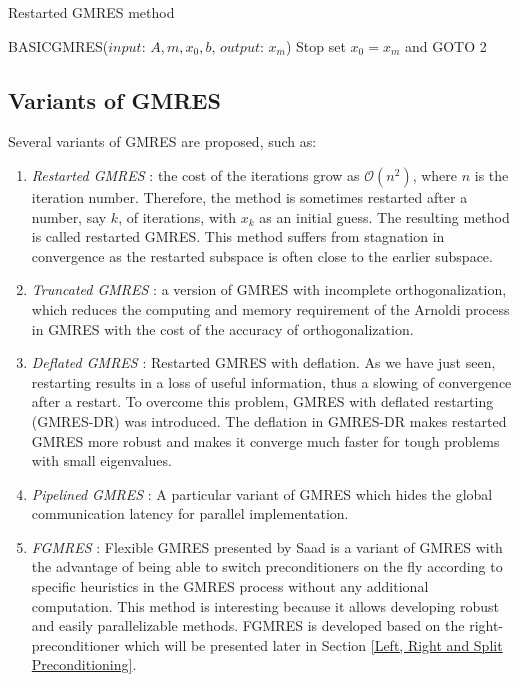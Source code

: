 \begin{algorithm}[htbp]
	\caption{Restarted GMRES method}
	\label{alg:rgmres}
	\begin{algorithmic}[1]
		\State BASICGMRES($input$: $A, m, x_0,b$, $output$: $x_m$)
		\State Stop
		\Else \State set $x_0 = x_m$ and GOTO 2
		\EndIf
		\EndFunction
	\end{algorithmic}
\end{algorithm}

\subsection{Variants of GMRES}

Several variants of GMRES are proposed, such as:

\begin{enumerate}
	\item \textit{Restarted GMRES} \cite{morgan1995restarted}: the cost of the iterations grow as $\mathcal{O}(n^2)$, where $n$ is the iteration number. Therefore, the method is sometimes restarted after a number, say $k$, of iterations, with $x_k$ as an initial guess. The resulting method is called restarted GMRES. This method suffers from stagnation in convergence as the restarted subspace is often close to the earlier subspace.
	
	\item \textit{Truncated GMRES} \cite{de1999truncation}: a version of GMRES with incomplete orthogonalization, which reduces the computing and memory requirement of the Arnoldi process in GMRES with the cost of the accuracy of orthogonalization.
	
	\item \textit{Deflated GMRES} \cite{erhel1996restarted}: Restarted GMRES with deflation. As we have just seen, restarting results in a loss of useful information, thus a slowing of convergence after a restart. To overcome this problem, GMRES with deflated restarting (GMRES-DR) was introduced. The deflation in GMRES-DR makes restarted GMRES more robust and makes it converge much faster for tough problems with small eigenvalues.
	
	\item \textit{Pipelined GMRES} \cite{ghysels2014hiding}: A particular variant of GMRES which hides the global communication latency for parallel implementation.
	
	\item \textit{FGMRES} \cite{fraysse2008algorithm}: Flexible GMRES presented by Saad is a variant of GMRES with the advantage of being able to switch preconditioners on the fly according to specific heuristics in the GMRES process without any additional computation. This method is interesting because it allows developing robust and easily parallelizable methods. FGMRES is developed based on the right-preconditioner which will be presented later in Section \ref{Left, Right and Split Preconditioning}.
	
\end{enumerate}

